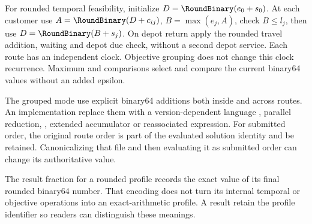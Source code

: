 For rounded temporal feasibility, initialize $D=\RoundBinary(e_0+s_0)$. At each customer use $A=\RoundBinary(D+c_{ij})$, $B=\max(e_j,A)$, check $B\leq l_j$, then use $D=\RoundBinary(B+s_j)$. On depot return apply the rounded travel addition, waiting and depot due check, without a second depot service. Each route has an independent clock. Objective grouping does not change this clock recurrence. Maximum and comparisons select and compare the current binary64 values without an added epsilon.

The grouped mode \must{} use explicit binary64 additions both inside and across routes. An implementation \mustnot{} replace them with a version-dependent language , parallel reduction, , extended accumulator or reassociated expression. For submitted order, the original route order is part of the evaluated solution identity and \must{} be retained. Canonicalizing that file and then evaluating it as submitted order can change its authoritative value.

The result fraction for a rounded profile records the exact value of its final rounded binary64 number. That encoding does not turn its internal temporal or objective operations into an exact-arithmetic profile. A result \must{} retain the profile identifier so readers can distinguish these meanings.
